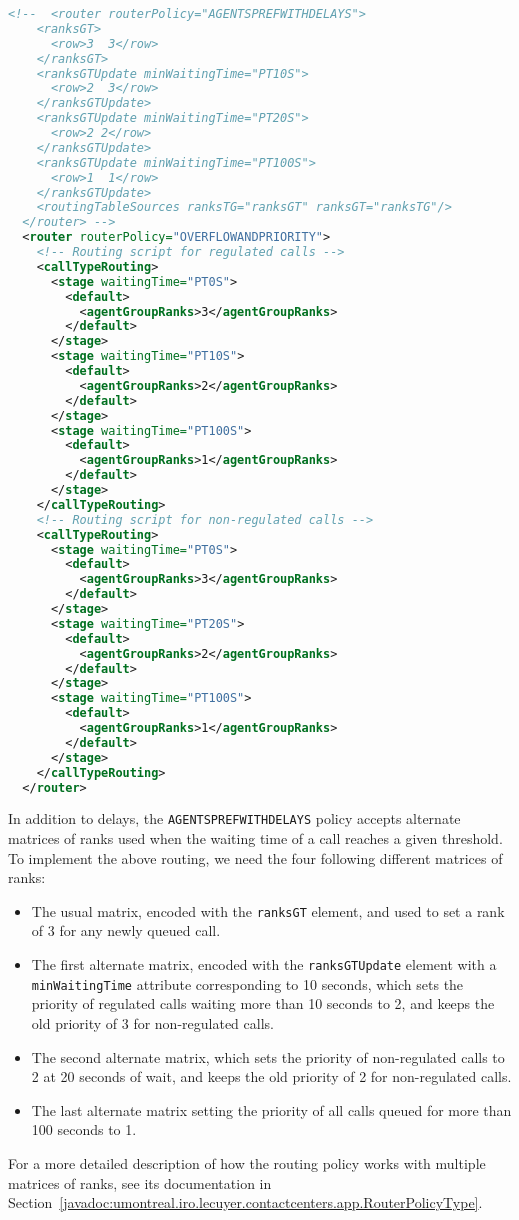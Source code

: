 \begin{lstlisting}[caption={Part of \texttt{op-singleQueue-cp.xml}:
    routing parameters for an example of priorities of calls evolving with waiting
  time}, label=par:op-singleQueue-cp, language=XML]
<!--  <router routerPolicy="AGENTSPREFWITHDELAYS">
    <ranksGT>
      <row>3  3</row>
    </ranksGT>
    <ranksGTUpdate minWaitingTime="PT10S">
      <row>2  3</row>
    </ranksGTUpdate>
    <ranksGTUpdate minWaitingTime="PT20S">
      <row>2 2</row>
    </ranksGTUpdate>
    <ranksGTUpdate minWaitingTime="PT100S">
      <row>1  1</row>
    </ranksGTUpdate>
    <routingTableSources ranksTG="ranksGT" ranksGT="ranksTG"/>
  </router> -->
  <router routerPolicy="OVERFLOWANDPRIORITY">
    <!-- Routing script for regulated calls -->
    <callTypeRouting>
      <stage waitingTime="PT0S">
        <default>
          <agentGroupRanks>3</agentGroupRanks>
        </default>
      </stage>
      <stage waitingTime="PT10S">
        <default>
          <agentGroupRanks>2</agentGroupRanks>
        </default>
      </stage>
      <stage waitingTime="PT100S">
        <default>
          <agentGroupRanks>1</agentGroupRanks>
        </default>
      </stage>
    </callTypeRouting>
    <!-- Routing script for non-regulated calls -->
    <callTypeRouting>
      <stage waitingTime="PT0S">
        <default>
          <agentGroupRanks>3</agentGroupRanks>
        </default>
      </stage>
      <stage waitingTime="PT20S">
        <default>
          <agentGroupRanks>2</agentGroupRanks>
        </default>
      </stage>
      <stage waitingTime="PT100S">
        <default>
          <agentGroupRanks>1</agentGroupRanks>
        </default>
      </stage>
    </callTypeRouting>
  </router>
\end{lstlisting}

In addition to delays, the \texttt{AGENTSPREFWITHDELAYS} policy
accepts alternate matrices of ranks used when the waiting time of a
call reaches a given threshold.
To implement the above routing, we need the four following different
matrices of ranks:
\begin{itemize}
\item The usual matrix, encoded with the \texttt{ranksGT} element, and
  used to set a rank of 3 for any newly queued call.
\item The first alternate matrix, encoded with the
  \texttt{ranksGTUpdate} element with a \texttt{min\-Waiting\-Time}
  attribute corresponding to 10 seconds, which sets the priority of
  regulated calls waiting more than 10 seconds to 2, and keeps the old
  priority of 3 for non-regulated calls.
\item The second alternate matrix, which sets the priority of
  non-regulated calls to 2 at 20 seconds of wait, and keeps the old
  priority of 2 for non-regulated calls.
\item The last alternate matrix
  setting the priority of all calls queued for more than 100
  seconds to 1.
\end{itemize}
For a more detailed description of how the routing policy works with
multiple matrices of ranks, see its documentation in
Section~\ref{javadoc:umontreal.iro.lecuyer.contactcenters.app.RouterPolicyType}.

